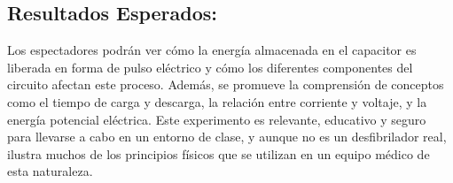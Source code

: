 \subsection{Resultados Esperados:}
Los espectadores podrán ver cómo la energía almacenada en el capacitor es liberada en forma de pulso eléctrico y cómo los diferentes componentes del circuito afectan este proceso. Además, se promueve la comprensión de conceptos como el tiempo de carga y descarga, la relación entre corriente y voltaje, y la energía potencial eléctrica.\newline \hfill \break
Este experimento es relevante, educativo y seguro para llevarse a cabo en un entorno de clase, y aunque no es un desfibrilador real, ilustra muchos de los principios físicos que se utilizan en un equipo médico de esta naturaleza.

